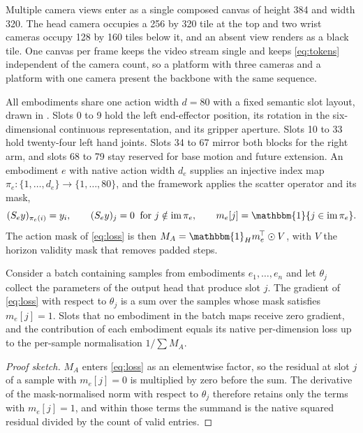 Multiple camera views enter as a single composed canvas of height 384 and width
320. The head camera occupies a 256 by 320 tile at the top and two wrist cameras
occupy 128 by 160 tiles below it, and an absent view renders as a black tile.
One canvas per frame keeps the video stream single and keeps
\eqref{eq:tokens} independent of the camera count, so a platform with three
cameras and a platform with one camera present the backbone with the same
sequence.

All embodiments share one action width $d = 80$ with a fixed semantic slot
layout, drawn in . Slots 0 to 9 hold the left end-effector
position, its rotation in the six-dimensional continuous representation, and its
gripper aperture. Slots 10 to 33 hold twenty-four left hand joints. Slots 34 to
67 mirror both blocks for the right arm, and slots 68 to 79 stay reserved for
base motion and future extension. An embodiment $e$ with native action width
$d_e$ supplies an injective index map
$\pi_e : \{1, \dots, d_e\} \to \{1, \dots, 80\}$, and the framework applies the
scatter operator and its mask,
\begin{equation}
  (S_e y)_{\pi_e(i)} = y_i, \qquad
  (S_e y)_{j} = 0 \;\; \text{for } j \notin \mathrm{im}\,\pi_e,
  \qquad
  m_e[j] = \mathbbm{1}\{ j \in \mathrm{im}\,\pi_e \}.
  \label{eq:scatter}
\end{equation}
The action mask of \eqref{eq:loss} is then
$M_A = \mathbbm{1}_{H} m_e^{\!\top} \odot V$, with $V$ the horizon validity mask
that removes padded steps.

\begin{proposition}
\label{prop:slots}
Consider a batch containing samples from embodiments $e_1, \dots, e_n$ and let
$\theta_j$ collect the parameters of the output head that produce slot $j$. The
gradient of \eqref{eq:loss} with respect to $\theta_j$ is a sum over the samples
whose mask satisfies $m_{e}[j] = 1$. Slots that no embodiment in the batch maps
receive zero gradient, and the contribution of each embodiment equals its native
per-dimension loss up to the per-sample normalisation $1 / \sum M_A$.
\end{proposition}

\begin{proof}[Proof sketch]
$M_A$ enters \eqref{eq:loss} as an elementwise factor, so the residual at slot
$j$ of a sample with $m_e[j] = 0$ is multiplied by zero before the sum. The
derivative of the mask-normalised norm with respect to $\theta_j$ therefore
retains only the terms with $m_e[j] = 1$, and within those terms the summand is
the native squared residual divided by the count of valid entries.
\end{proof}

